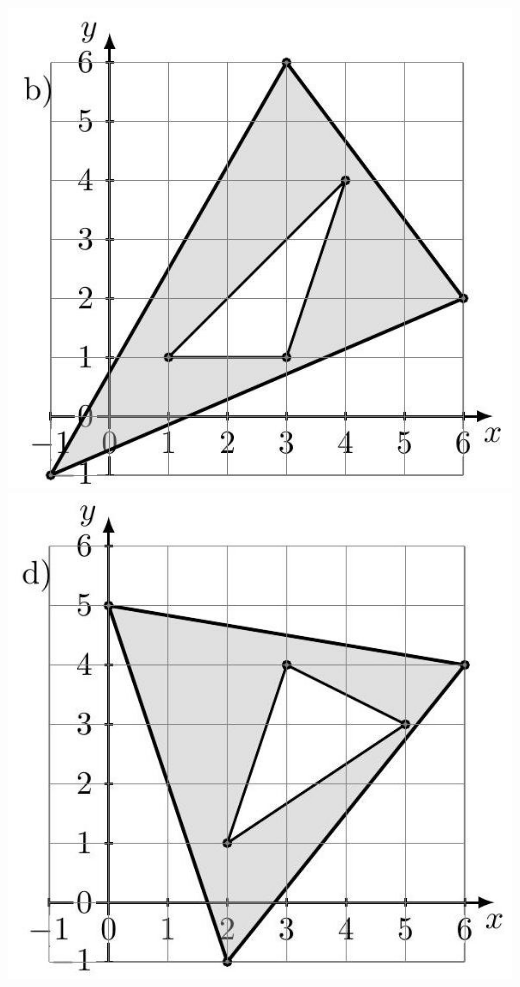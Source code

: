 \documentclass[10pt]{article}
\begin{document}
\includegraphics[max width=\textwidth, center]{2024_11_21_8f01584889ff06348ae7g-209(1)}\\
\includegraphics[max width=\textwidth, center]{2024_11_21_8f01584889ff06348ae7g-209(5)}\\
\end{document}
